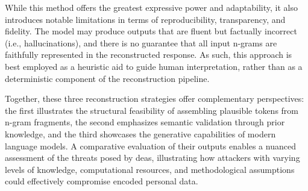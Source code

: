 While this method offers the greatest expressive power and adaptability, it also introduces notable limitations in terms of reproducibility, transparency, and fidelity.
The model may produce outputs that are fluent but factually incorrect (i.e., hallucinations), and there is no guarantee that all input n-grams are faithfully represented in the reconstructed response.
As such, this approach is best employed as a heuristic aid to guide human interpretation, rather than as a deterministic component of the reconstruction pipeline.

Together, these three reconstruction strategies offer complementary perspectives: the first illustrates the structural feasibility of assembling plausible tokens from n-gram fragments, the second emphasizes semantic validation through prior knowledge, and the third showcases the generative capabilities of modern language models.
A comparative evaluation of their outputs enables a nuanced assessment of the threats posed by \ac{dea}s, illustrating how attackers with varying levels of knowledge, computational resources, and methodological assumptions could effectively compromise encoded personal data.


